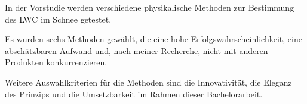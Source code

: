 
In der Vorstudie werden verschiedene physikalische Methoden zur Bestimmung des LWC im Schnee getestet.

Es wurden sechs Methoden gewählt, die eine hohe Erfolgswahrscheinlichkeit, eine abschätzbaren Aufwand und, nach meiner Recherche, nicht mit anderen Produkten konkurrenzieren.

Weitere Auswahlkriterien für die Methoden sind die Innovativität, die Eleganz des Prinzips und die Umsetzbarkeit im Rahmen dieser Bachelorarbeit.
